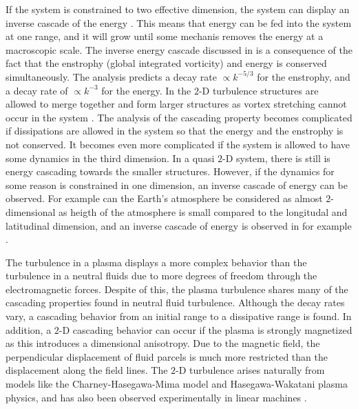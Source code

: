 If the system is constrained to two effective dimension, the system can display an inverse cascade of the energy \cite{Kraichan1980}.
This means that energy can be fed into the system at one range, and it will grow until some mechanis removes the energy at a macroscopic scale.
The inverse energy cascade discussed in \cite{Kraichan1980} is a consequence of the fact that the enstrophy (global integrated vorticity) and energy is conserved simultaneously.
The analysis predicts a decay rate $\propto k^{-5/3}$ for the enstrophy, and a decay rate of $\propto k^{-3}$ for the energy.
In the $2$-D turbulence structures are allowed to merge together and form larger structures as vortex stretching cannot occur in the system \cite{Fjortoft1953}.
The analysis of the cascading property becomes complicated if dissipations are allowed in the system so that the energy and the enstrophy is not conserved.
It becomes even more complicated if the system is allowed to have some dynamics in the third dimension.
In a quasi $2$-D system, there is still is energy cascading towards the smaller structures.
However, if the dynamics for some reason is constrained in one dimension, an inverse cascade of energy can be observed.
For example can the Earth's atmosphere be considered as almost $2$-dimensional as heigth of the atmosphere is small compared to the longitudal and latitudinal dimension, and an inverse cascade of energy is observed in for example \cite{Smith2002}.

The turbulence in a plasma displays a more complex behavior than the turbulence in a neutral fluids due to more degrees of freedom through the electromagnetic forces.
Despite of this, the plasma turbulence shares many of the cascading properties found in neutral fluid turbulence.
Although the decay rates vary, a cascading behavior from an initial range to a dissipative range is found.
In addition, a $2$-D cascading behavior can occur if the plasma is strongly magnetized as this introduces a dimensional anisotropy.
Due to the magnetic field, the perpendicular displacement of fluid parcels is much more restricted than the displacement along the field lines.
The $2$-D turbulence arises naturally from models like the Charney-Hasegawa-Mima model \cite{Boffetta2002} and Hasegawa-Wakatani \cite{Manz2009} plasma physics, and has also been observed experimentally in linear machines \cite{Tynan2006a}.

